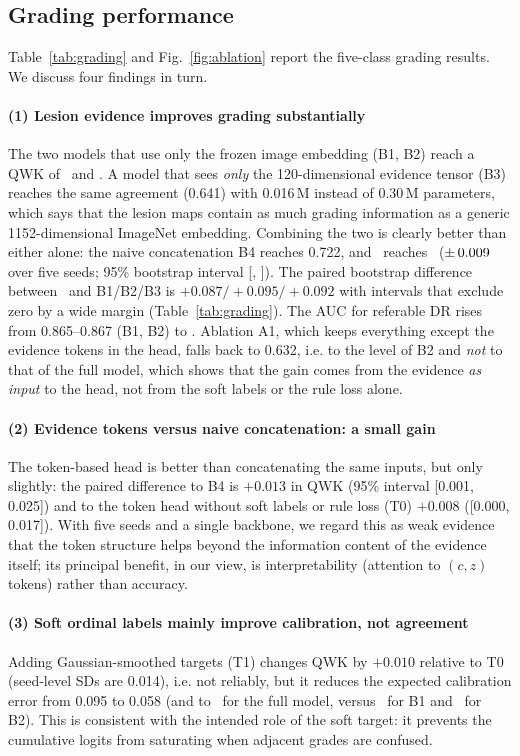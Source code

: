 \subsection{Grading performance}
\label{sec:res-grading}
Table~\ref{tab:grading} and Fig.~\ref{fig:ablation} report the five-class grading results. We discuss four findings in turn.

\paragraph{(1) Lesion evidence improves grading substantially} The two models that use only the frozen image embedding (B1, B2) reach a QWK of \nBoneQWK\ and \nBtwoQWK. A model that sees \emph{only} the 120-dimensional evidence tensor (B3) reaches the same agreement (0.641) with 0.016\,M instead of 0.30\,M parameters, which says that the lesion maps contain as much grading information as a generic 1152-dimensional ImageNet embedding. Combining the two is clearly better than either alone: the naive concatenation B4 reaches 0.722, and \mname\ reaches \nMainQWK\ ($\pm\,0.009$ over five seeds; 95\% bootstrap interval [\nMainCIlo, \nMainCIhi]). The paired bootstrap difference between \mname\ and B1/B2/B3 is $+0.087/+0.095/+0.092$ with intervals that exclude zero by a wide margin (Table~\ref{tab:grading}). The AUC for referable DR rises from 0.865--0.867 (B1, B2) to \nMainAUC. Ablation A1, which keeps everything except the evidence tokens in the head, falls back to 0.632, i.e. to the level of B2 and \emph{not} to that of the full model, which shows that the gain comes from the evidence \emph{as input} to the head, not from the soft labels or the rule loss alone.

\paragraph{(2) Evidence tokens versus naive concatenation: a small gain} The token-based head is better than concatenating the same inputs, but only slightly: the paired difference to B4 is $+0.013$ in QWK (95\% interval [0.001, 0.025]) and to the token head without soft labels or rule loss (T0) $+0.008$ ([0.000, 0.017]). With five seeds and a single backbone, we regard this as weak evidence that the token structure helps beyond the information content of the evidence itself; its principal benefit, in our view, is interpretability (attention to $(c,z)$ tokens) rather than accuracy.

\paragraph{(3) Soft ordinal labels mainly improve calibration, not agreement} Adding Gaussian-smoothed targets (T1) changes QWK by $+0.010$ relative to T0 (seed-level SDs are 0.014), i.e. not reliably, but it reduces the expected calibration error from 0.095 to 0.058 (and to \nMainECE\ for the full model, versus \nBoneECE\ for B1 and \nBtwoECE\ for B2). This is consistent with the intended role of the soft target: it prevents the cumulative logits from saturating when adjacent grades are confused.

